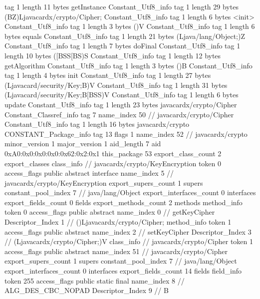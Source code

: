 {{{			tag	1
			length	11
			bytes	getInstance
		}
		Constant_Utf8_info {
			tag	1
			length	29
			bytes	(BZ)Ljavacardx/crypto/Cipher;
		}
		Constant_Utf8_info {
			tag	1
			length	6
			bytes	<init>
		}
		Constant_Utf8_info {
			tag	1
			length	3
			bytes	()V
		}
		Constant_Utf8_info {
			tag	1
			length	6
			bytes	equals
		}
		Constant_Utf8_info {
			tag	1
			length	21
			bytes	(Ljava/lang/Object;)Z
		}
		Constant_Utf8_info {
			tag	1
			length	7
			bytes	doFinal
		}
		Constant_Utf8_info {
			tag	1
			length	10
			bytes	([BSS[BS)S
		}
		Constant_Utf8_info {
			tag	1
			length	12
			bytes	getAlgorithm
		}
		Constant_Utf8_info {
			tag	1
			length	3
			bytes	()B
		}
		Constant_Utf8_info {
			tag	1
			length	4
			bytes	init
		}
		Constant_Utf8_info {
			tag	1
			length	27
			bytes	(Ljavacard/security/Key;B)V
		}
		Constant_Utf8_info {
			tag	1
			length	31
			bytes	(Ljavacard/security/Key;B[BSS)V
		}
		Constant_Utf8_info {
			tag	1
			length	6
			bytes	update
		}
		Constant_Utf8_info {
			tag	1
			length	23
			bytes	javacardx/crypto/Cipher
		}
		Constant_Classref_info {
			tag	7
			name_index	50		// javacardx/crypto/Cipher
		}
		Constant_Utf8_info {
			tag	1
			length	16
			bytes	javacardx/crypto
		}
		CONSTANT_Package_info {
			tag	13
			flags	1
			name_index	52		// javacardx/crypto
			minor_version	1
			major_version	1
			aid_length	7
			aid	0xA0:0x0:0x0:0x0:0x62:0x2:0x1
		}
	}
	this_package	53
	export_class_count	2
	export_classes {
		class_info {		// javacardx/crypto/KeyEncryption
			token	0
			access_flags	public abstract interface
			name_index	5		// javacardx/crypto/KeyEncryption
			export_supers_count	1
			supers {
				constant_pool_index	7		// java/lang/Object
			}
			export_interfaces_count	0
			interfaces {
			}
			export_fields_count	0
			fields {
			}
			export_methods_count	2
			methods {
				method_info {
					token	0
					access_flags	public abstract
					name_index	0		// getKeyCipher
					Descriptor_Index	1		// ()Ljavacardx/crypto/Cipher;
				}
				method_info {
					token	1
					access_flags	public abstract
					name_index	2		// setKeyCipher
					Descriptor_Index	3		// (Ljavacardx/crypto/Cipher;)V
				}
			}
		}
		class_info {		// javacardx/crypto/Cipher
			token	1
			access_flags	public abstract
			name_index	51		// javacardx/crypto/Cipher
			export_supers_count	1
			supers {
				constant_pool_index	7		// java/lang/Object
			}
			export_interfaces_count	0
			interfaces {
			}
			export_fields_count	14
			fields {
			field_info {
				token	255
				access_flags	public static final
				name_index	8		// ALG_DES_CBC_NOPAD
				Descriptor_Index	9		// B
}}}}}
